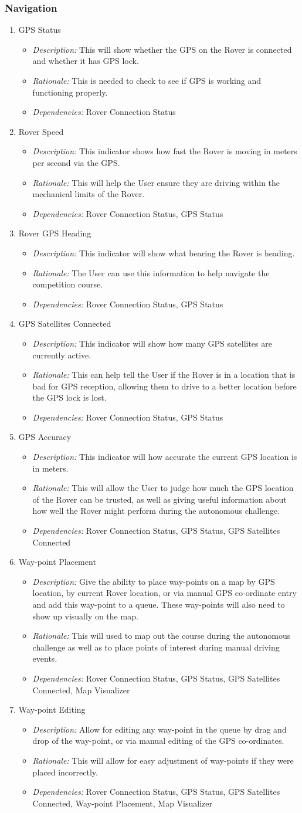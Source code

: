 \documentclass[onecolumn, draftclsnofoot, 10pt, compsoc]{IEEEtran}
\newcommand{\functRequ}[4]{
\item #1%
\par
\begin{itemize}
\item \textit{Description:} #2.%
\item \textit{Rationale:} #3.%
\item \textit{Dependencies:} #4%
\end{itemize}
}
\begin{document}
\subsubsection{Navigation}
\begin{enumerate}
\functRequ{GPS Status}
{This will show whether the GPS on the Rover is connected and whether it has GPS lock}
{This is needed to check to see if GPS is working and functioning properly}
{Rover Connection Status}

\functRequ{Rover Speed}
{This indicator shows how fast the Rover is moving in meters per second via the GPS}
{This will help the User ensure they are driving within the mechanical limits of the Rover}
{Rover Connection Status, GPS Status}

\functRequ{Rover GPS Heading}
{This indicator will show what bearing the Rover is heading}
{The User can use this information to help navigate the competition course}
{Rover Connection Status, GPS Status}

\functRequ{GPS Satellites Connected}
{This indicator will show how many GPS satellites are currently active}
{This can help tell the User if the Rover is in a location that is bad for GPS reception, allowing them to drive to a better location before the GPS lock is lost}
{Rover Connection Status, GPS Status}

\functRequ{GPS Accuracy}
{This indicator will how accurate the current GPS location is in meters}
{This will allow the User to judge how much the GPS location of the Rover can be trusted, as well as giving useful information about how well the Rover might perform during the autonomous challenge}
{Rover Connection Status, GPS Status, GPS Satellites Connected}

\functRequ{Way-point Placement}
{Give the ability to place way-points on a map by GPS location, by current Rover location, or via manual GPS co-ordinate entry and add this way-point to a queue.
These way-points will also need to show up visually on the map}
{This will used to map out the course during the autonomous challenge as well as to place points of interest during manual driving events}
{Rover Connection Status, GPS Status, GPS Satellites Connected, Map Visualizer}

\functRequ{Way-point Editing}
{Allow for editing any way-point in the queue by drag and drop of the way-point, or via manual editing of the GPS co-ordinates}
{This will allow for easy adjustment of way-points if they were placed incorrectly}
{Rover Connection Status, GPS Status, GPS Satellites Connected, Way-point Placement, Map Visualizer}


\end{enumerate}
\end{document}
